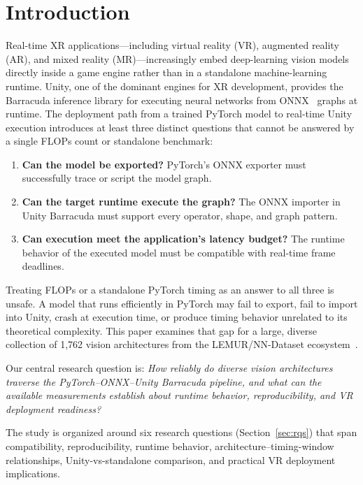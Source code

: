 \documentclass[10pt,twocolumn]{article}
\begin{document}
\section{Introduction}\label{sec:introduction}

Real-time XR applications---including virtual reality (VR), augmented reality (AR), and mixed reality (MR)---increasingly embed deep-learning vision models directly inside a game engine rather than in a standalone machine-learning runtime. Unity, one of the dominant engines for XR development, provides the Barracuda inference library for executing neural networks from ONNX~\cite{onnx2019} graphs at runtime. The deployment path from a trained PyTorch model to real-time Unity execution introduces at least three distinct questions that cannot be answered by a single FLOPs count or standalone benchmark:

\begin{enumerate}[nosep,leftmargin=*]
  \item \textbf{Can the model be exported?} PyTorch's ONNX exporter must successfully trace or script the model graph.
  \item \textbf{Can the target runtime execute the graph?} The ONNX importer in Unity Barracuda must support every operator, shape, and graph pattern.
  \item \textbf{Can execution meet the application's latency budget?} The runtime behavior of the executed model must be compatible with real-time frame deadlines.
\end{enumerate}

Treating FLOPs or a standalone PyTorch timing as an answer to all three is unsafe. A model that runs efficiently in PyTorch may fail to export, fail to import into Unity, crash at execution time, or produce timing behavior unrelated to its theoretical complexity. This paper examines that gap for a large, diverse collection of 1,762 vision architectures from the LEMUR/NN-Dataset ecosystem~\cite{ABrain.NN-Dataset, ABrain.LEMUR2}.

Our central research question is: \emph{How reliably do diverse vision architectures traverse the PyTorch--ONNX--Unity Barracuda pipeline, and what can the available measurements establish about runtime behavior, reproducibility, and VR deployment readiness?}

The study is organized around six research questions (Section~\ref{sec:rqs}) that span compatibility, reproducibility, runtime behavior, architecture--timing-window relationships, Unity-vs-standalone comparison, and practical VR deployment implications.
\end{document}
